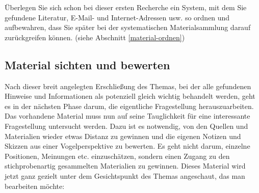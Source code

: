 \documentclass[]{book}
\theoremstyle{definition}
\theoremstyle{definition}
\theoremstyle{definition}
\theoremstyle{remark}
\begin{document}
Überlegen Sie sich schon bei dieser ersten Recherche ein System, mit dem
Sie gefundene Literatur, E-Mail- und Internet-Adressen usw. so ordnen
und aufbewahren, dass Sie später bei der systematischen Materialsammlung
darauf zurückgreifen können. (siehe Abschnitt \ref{material-ordnen})

\subsection{Material sichten und
bewerten}\label{material-sichten-und-bewerten}

Nach dieser breit angelegten Erschließung des Themas, bei der alle
gefundenen Hinweise und Informationen als potenziell gleich wichtig
behandelt werden, geht es in der nächsten Phase darum, die eigentliche
Fragestellung herauszuarbeiten. Das vorhandene Material muss nun auf
seine Tauglichkeit für eine interessante Fragestellung untersucht
werden. Dazu ist es notwendig, von den Quellen und Materialien wieder
etwas Distanz zu gewinnen und die eigenen Notizen und Skizzen aus einer
Vogelperspektive zu bewerten. Es geht nicht darum, einzelne Positionen,
Meinungen etc. einzuschätzen, sondern einen Zugang zu den
stichprobenartig gesammelten Materialien zu gewinnen. Dieses Material
wird jetzt ganz gezielt unter dem Gesichtspunkt des Themas angeschaut,
das man bearbeiten möchte:
\end{document}
